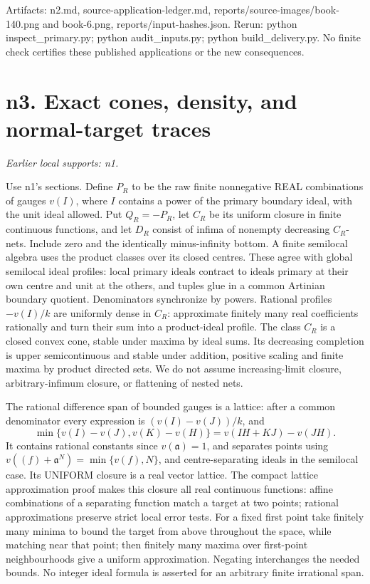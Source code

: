 \documentclass[11pt]{article}
\begin{document}
Artifacts: n2.md, source-application-ledger.md, reports/source-images/book-140.png and book-6.png, reports/input-hashes.json. Rerun: python inspect\_primary.py; python audit\_inputs.py; python build\_delivery.py. No finite check certifies these published applications or the new consequences.

\section{n3. Exact cones, density, and normal-target traces}
\textit{Earlier local supports: n1.}

Use n1's sections. Define \(P_R\) to be the raw finite nonnegative REAL combinations of gauges \(v(I)\), where \(I\) contains a power of the primary boundary ideal, with the unit ideal allowed. Put \(Q_R=-P_R\), let \(C_R\) be its uniform closure in finite continuous functions, and let \(D_R\) consist of infima of nonempty decreasing \(C_R\)-nets. Include zero and the identically minus-infinity bottom. A finite semilocal algebra uses the product classes over its closed centres. These agree with global semilocal ideal profiles: local primary ideals contract to ideals primary at their own centre and unit at the others, and tuples glue in a common Artinian boundary quotient. Denominators synchronize by powers. Rational profiles \(-v(I)/k\) are uniformly dense in \(C_R\): approximate finitely many real coefficients rationally and turn their sum into a product-ideal profile. The class \(C_R\) is a closed convex cone, stable under maxima by ideal sums. Its decreasing completion is upper semicontinuous and stable under addition, positive scaling and finite maxima by product directed sets. We do not assume increasing-limit closure, arbitrary-infimum closure, or flattening of nested nets.

The rational difference span of bounded gauges is a lattice: after a common denominator every expression is \((v(I)-v(J))/k\), and
\[
\min\{v(I)-v(J),v(K)-v(H)\}=v(IH+KJ)-v(JH).
\]
It contains rational constants since \(v(\mathfrak a)=1\), and separates points using \(v((f)+\mathfrak a^N)=\min\{v(f),N\}\), and centre-separating ideals in the semilocal case. Its UNIFORM closure is a real vector lattice. The compact lattice approximation proof makes this closure all real continuous functions: affine combinations of a separating function match a target at two points; rational approximations preserve strict local error tests. For a fixed first point take finitely many minima to bound the target from above throughout the space, while matching near that point; then finitely many maxima over first-point neighbourhoods give a uniform approximation. Negating interchanges the needed bounds. No integer ideal formula is asserted for an arbitrary finite irrational span.
\end{document}
